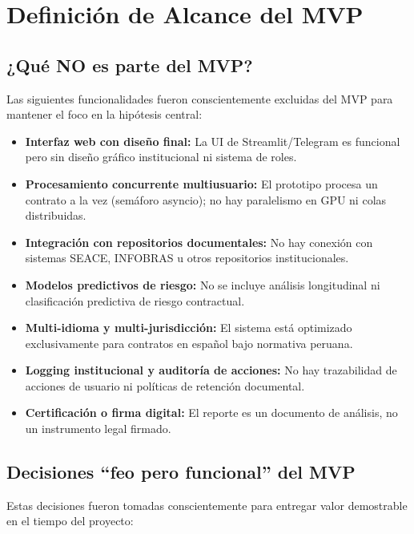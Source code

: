 \section{Definición de Alcance del MVP}

\subsection{¿Qué NO es parte del MVP?}

Las siguientes funcionalidades fueron conscientemente excluidas del MVP
para mantener el foco en la hipótesis central:

\begin{itemize}
    \item \textbf{Interfaz web con diseño final:} La UI de Streamlit/Telegram
    es funcional pero sin diseño gráfico institucional ni sistema de roles.
    \item \textbf{Procesamiento concurrente multiusuario:} El prototipo
    procesa un contrato a la vez (semáforo asyncio); no hay paralelismo
    en GPU ni colas distribuidas.
    \item \textbf{Integración con repositorios documentales:} No hay
    conexión con sistemas SEACE, INFOBRAS u otros repositorios
    institucionales.
    \item \textbf{Modelos predictivos de riesgo:} No se incluye análisis
    longitudinal ni clasificación predictiva de riesgo contractual.
    \item \textbf{Multi-idioma y multi-jurisdicción:} El sistema está
    optimizado exclusivamente para contratos en español bajo normativa peruana.
    \item \textbf{Logging institucional y auditoría de acciones:} No hay
    trazabilidad de acciones de usuario ni políticas de retención documental.
    \item \textbf{Certificación o firma digital:} El reporte es un documento
    de análisis, no un instrumento legal firmado.
\end{itemize}

\subsection{Decisiones ``feo pero funcional'' del MVP}

Estas decisiones fueron tomadas conscientemente para entregar valor
demostrable en el tiempo del proyecto:

